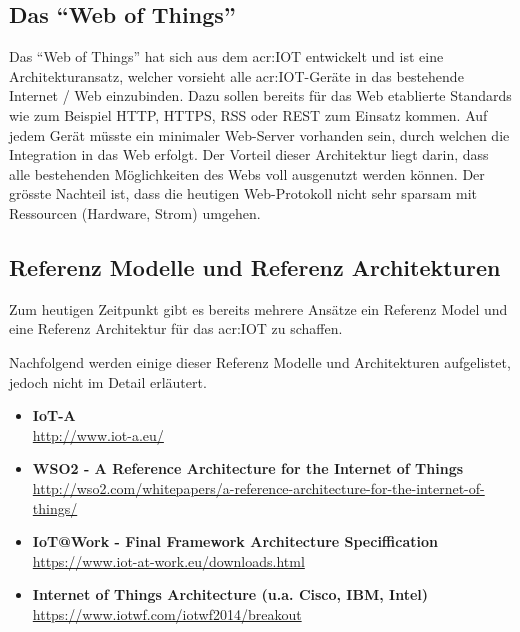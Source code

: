 \subsection{Das "`Web of Things"'}
Das "`Web of Things"' hat sich aus dem \gls{acr:IOT} entwickelt und ist eine Architekturansatz, welcher vorsieht alle \gls{acr:IOT}-Geräte in das bestehende Internet / Web einzubinden. Dazu sollen bereits für das Web etablierte Standards wie zum Beispiel HTTP, HTTPS, RSS oder REST zum Einsatz kommen. Auf jedem Gerät müsste ein minimaler Web-Server vorhanden sein, durch welchen die Integration in das Web erfolgt. Der Vorteil dieser Architektur liegt darin, dass alle bestehenden Möglichkeiten des Webs voll ausgenutzt werden können. Der grösste Nachteil ist, dass die heutigen Web-Protokoll nicht sehr sparsam mit Ressourcen (Hardware, Strom) umgehen.

\subsection{Referenz Modelle und Referenz Architekturen}
Zum heutigen Zeitpunkt gibt es bereits mehrere Ansätze ein Referenz Model und eine Referenz Architektur für das \gls{acr:IOT} zu schaffen.

Nachfolgend werden einige dieser Referenz Modelle und Architekturen aufgelistet, jedoch nicht im Detail erläutert.

\begin{itemize}
\item \textbf{IoT-A}\\
\url{http://www.iot-a.eu/}
\item \textbf{WSO2 - A Reference Architecture for the Internet of Things}\\
\url{http://wso2.com/whitepapers/a-reference-architecture-for-the-internet-of-things/}
\item \textbf{IoT@Work - Final Framework Architecture Speciffication}\\
\url{https://www.iot-at-work.eu/downloads.html}
\item \textbf{Internet of Things Architecture (u.a. Cisco, IBM, Intel)}\\
\url{https://www.iotwf.com/iotwf2014/breakout}
\end{itemize}


